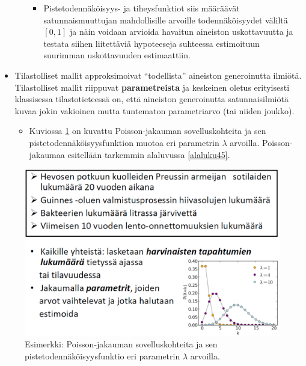 \documentclass[
]{book}
\providecommand{\tightlist}{%
  \setlength{\itemsep}{0pt}\setlength{\parskip}{0pt}}
\begin{document}
\begin{itemize}
\begin{itemize}
    \begin{itemize}
    \tightlist
    \item
      Pistetodennäköisyys- ja tiheysfunktiot siis määräävät satunnaismuuttujan mahdollisille arvoille todennäköisyydet väliltä \([0,1]\) ja näin voidaan arvioida havaitun aineiston uskottavuutta ja testata siihen liitettäviä hypoteeseja suhteessa estimoituun suurimman uskottavuuden estimaattiin.
    \end{itemize}
  \end{itemize}
\item
  Tilastolliset mallit approksimoivat ``todellista'' aineiston generoinutta ilmiötä. Tilastolliset mallit riippuvat \textbf{parametreista} ja keskeinen oletus erityisesti klassisessa tilastotieteessä on, että aineiston generoinutta satunnaisilmiötä kuvaa jokin vakioinen mutta tuntematon parametriarvo (tai niiden joukko).

  \begin{itemize}
  \tightlist
  \item
    Kuviossa \ref{fig:poisson} on kuvattu Poisson-jakauman sovelluskohteita ja sen pistetodennäköisyysfunktion muotoa eri parametrin \(\lambda\) arvoilla. Poisson-jakaumaa esitellään tarkemmin alaluvussa \ref{alaluku45}.
  \end{itemize}
\end{itemize}

\begin{figure}

{\centering \includegraphics[width=1\linewidth]{images/poisson} 

}

\caption{Esimerkki: Poisson-jakauman sovelluskohteita ja sen pistetodennäköisyysfunktio eri parametrin $\lambda$ arvoilla.}\label{fig:poisson}
\end{figure}
\end{document}
